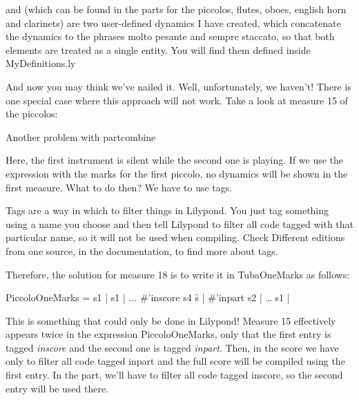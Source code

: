 \documentclass[../../LilyPond-Tutorials]{subfiles}
\begin{document}
 and  (which can be found in the parts for the piccolos, flutes, oboes, english horn and clarinets) are two user-defined dynamics I have created, which concatenate the dynamics to the phrases molto pesante and sempre staccato, so that both elements are treated as a single entity.
You will find them defined inside MyDefinitions.ly

And now you may think we've nailed it.
Well, unfortunately, we haven't!
There is one special case where this approach will not work.
Take a look at measure 15 of the piccolos:

\begin{musicExample}
\caption{Another problem with partcombine}
\label{xmp:partcombine-example-three}
\end{musicExample}

Here, the first instrument is silent while the second one is playing.
If we use the expression with the marks for the first piccolo, no dynamics will be shown in the first measure.
What to do then?
We have to use tags.

Tags are a way in which to filter things in Lilypond.
You just tag something using a name you choose and then tell Lilypond to filter all code tagged with that particular name, so it will not be used when compiling.
Check Different editions from one source, in the documentation, to find more about tags.

Therefore, the solution for measure 18 is to write it in TubaOneMarks  as follows:

\begin{lilypondcode}
PiccoloOneMarks = {
       s1 | %
       s1 | %
       ...
       \tag #'inscore { s4 s\f\< } | %
       \tag #'inpart { s2 } | %
       …
       s1 | %
}
\end{lilypondcode}

This is something that could only be done in Lilypond!
Measure 15 effectively appears twice in the expression PiccoloOneMarks, only that the first entry is tagged \emph{inscore} and the second one is tagged \emph{inpart}.
Then, in the score we have only to filter all code tagged inpart and the full score will be compiled using the first entry.
In the part, we'll have to filter all code tagged inscore, so the second entry will be used there.
\end{document}
